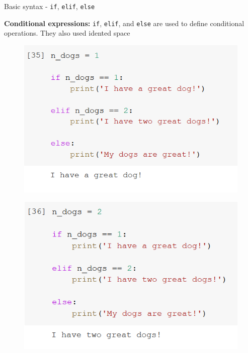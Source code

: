 \documentclass[aspectratio=169]{beamer}
\begin{document}
\begin{frame}{Basic syntax - \texttt{if}, \texttt{elif}, \texttt{else}}

       \textbf{Conditional expressions:}
	\texttt{if}, \texttt{elif}, and \texttt{else} are used to define conditional operations. They also used idented space

	\begin{multicols}{3}

		\begin{figure}
			\centering
			\includegraphics[width=\linewidth]{img/if.png}
		\end{figure}
		\begin{figure}
			\centering
			\includegraphics[width=\linewidth]{img/elif.png}
		\end{figure}
		\begin{figure}

\end{figure}
\end{multicols}
\end{frame}
\end{document}
